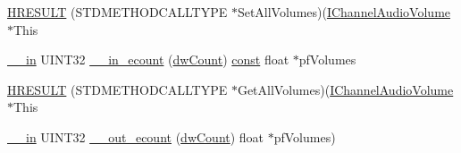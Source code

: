 \begin{DoxyCompactItemize}
\item 
\hyperlink{struct_i_channel_audio_volume_vtbl_a7143071c64f1fa69e086499532140a8a}{H\+R\+E\+S\+U\+LT} (S\+T\+D\+M\+E\+T\+H\+O\+D\+C\+A\+L\+L\+T\+Y\+PE $\ast$Set\+All\+Volumes)(\hyperlink{audioclient_8h_a46abbe93dca3b592534afab4d91d75f9}{I\+Channel\+Audio\+Volume} $\ast$This
\item 
\hyperlink{sal_8h_a3f6b8655e1aa9dfc15a9029f0343009e}{\+\_\+\+\_\+in} U\+I\+N\+T32 \hyperlink{struct_i_channel_audio_volume_vtbl_a48e4a1476aa12c608295cc5eb77f4e3f}{\+\_\+\+\_\+in\+\_\+ecount} (\hyperlink{struct_i_channel_audio_volume_vtbl_a6919d94fec4a1d2b47c8a1452748d745}{dw\+Count}) \hyperlink{getopt1_8c_a2c212835823e3c54a8ab6d95c652660e}{const} float $\ast$pf\+Volumes
\item 
\hyperlink{struct_i_channel_audio_volume_vtbl_a7c4023fd14799e1689d2b4980e98928b}{H\+R\+E\+S\+U\+LT} (S\+T\+D\+M\+E\+T\+H\+O\+D\+C\+A\+L\+L\+T\+Y\+PE $\ast$Get\+All\+Volumes)(\hyperlink{audioclient_8h_a46abbe93dca3b592534afab4d91d75f9}{I\+Channel\+Audio\+Volume} $\ast$This
\item 
\hyperlink{sal_8h_a3f6b8655e1aa9dfc15a9029f0343009e}{\+\_\+\+\_\+in} U\+I\+N\+T32 \hyperlink{struct_i_channel_audio_volume_vtbl_aaa9923c11649748b2fddbb9d802db26e}{\+\_\+\+\_\+out\+\_\+ecount} (\hyperlink{struct_i_channel_audio_volume_vtbl_a6919d94fec4a1d2b47c8a1452748d745}{dw\+Count}) float $\ast$pf\+Volumes)
\end{DoxyCompactItemize}
